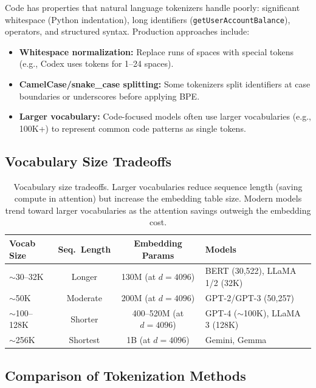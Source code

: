 Code has properties that natural language tokenizers handle poorly: significant whitespace
(Python indentation), long identifiers (\texttt{getUserAccountBalance}), operators, and
structured syntax.  Production approaches include:
\begin{itemize}
    \item \textbf{Whitespace normalization:} Replace runs of spaces with special tokens
          (e.g., Codex uses tokens for 1--24 spaces).
    \item \textbf{CamelCase/snake\_case splitting:} Some tokenizers split identifiers
          at case boundaries or underscores before applying BPE.
    \item \textbf{Larger vocabulary:} Code-focused models often use larger vocabularies
          (e.g., 100K+) to represent common code patterns as single tokens.
\end{itemize}

\subsection{Vocabulary Size Tradeoffs}

\begin{table}[H]
\centering
\small
\begin{tabularx}{\textwidth}{@{}l c c X@{}}
\toprule
\textbf{Vocab Size} & \textbf{Seq.\ Length} & \textbf{Embedding Params} & \textbf{Models} \\
\midrule
$\sim$30--32K & Longer   & 130M (at $d{=}4096$) & BERT (30,522), LLaMA 1/2 (32K) \\
$\sim$50K  & Moderate & 200M (at $d{=}4096$) & GPT-2/GPT-3 (50,257) \\
$\sim$100--128K & Shorter  & 400--520M (at $d{=}4096$) & GPT-4 ($\sim$100K), LLaMA 3 (128K) \\
$\sim$256K & Shortest & 1B (at $d{=}4096$) & Gemini, Gemma \\
\bottomrule
\end{tabularx}
\caption{Vocabulary size tradeoffs.  Larger vocabularies reduce sequence length (saving
compute in attention) but increase the embedding table size.  Modern models trend toward
larger vocabularies as the attention savings outweigh the embedding cost.}
\label{tab:vocab_size}
\end{table}

\subsection{Comparison of Tokenization Methods}

